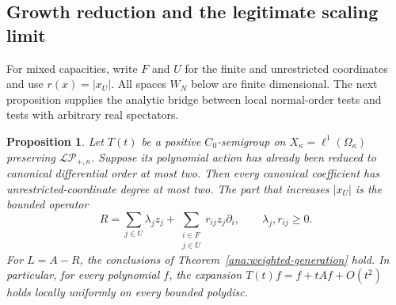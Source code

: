 \documentclass[reqno]{amsart}
\newtheorem{proposition}[theorem]{Proposition}
\theoremstyle{definition}
\theoremstyle{remark}
\begin{document}
\subsection{Growth reduction and the legitimate scaling limit}

For mixed capacities, write \(F\) and \(U\) for the finite and unrestricted
coordinates and use \(r(x)=|x_U|\).  All spaces \(W_N\) below are finite
dimensional.  The next proposition supplies the analytic bridge between
local normal-order tests and tests with arbitrary real spectators.

\begin{proposition}\label{ana:growth-reduction}
Let \(T(t)\) be a positive \(C_0\)-semigroup on \(X_\kappa=\ell^1(\Omega_\kappa)\)
preserving \(\mathcal{LP}_{+,\kappa}\).  Suppose its polynomial action has
already been reduced to canonical differential order at most two.  Then
every canonical coefficient has unrestricted-coordinate degree at most two.
The part that increases \(|x_U|\) is the bounded operator
\[
 R=\sum_{j\in U}\lambda_jz_j+
   \sum_{\substack{i\in F\\j\in U}}r_{ij}z_j\partial_i,
 \qquad \lambda_j,r_{ij}\ge0.
\]
For \(L=A-R\), the conclusions of
Theorem~\ref{ana:weighted-generation} hold.  In particular, for every
polynomial \(f\), the expansion
\(T(t)f=f+tAf+O(t^2)\) holds locally uniformly on every bounded polydisc.
\end{proposition}
\end{document}
